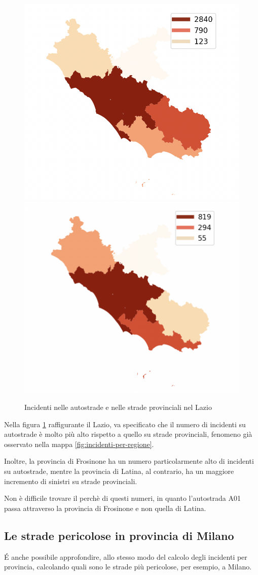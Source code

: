 \documentclass[a4paper]{report}
\begin{document}
\begin{figure}
    \includegraphics[width=0.5\linewidth]{../src/provincia/lazio_autostrade.png}
    \includegraphics[width=0.5\linewidth]{../src/provincia/lazio_strade_prov.png}
    \caption{Incidenti nelle autostrade e nelle strade provinciali nel Lazio}
    \label{fig:lazio-strade}
\end{figure}

Nella figura \ref{fig:lazio-strade} raffigurante il Lazio, va specificato che il numero 
di incidenti su autostrade è molto più alto rispetto a quello su strade provinciali, 
fenomeno già osservato nella mappa \ref{fig:incidenti-per-regione}.

Inoltre, la provincia di Frosinone ha un numero particolarmente alto di incidenti su 
autostrade, mentre la provincia di Latina, al contrario, ha un maggiore incremento di 
sinistri su strade provinciali.

Non è difficile trovare il perchè di questi numeri, in quanto l'autostrada A01 passa 
attraverso la provincia di Frosinone e non quella di Latina.

\subsection{Le strade pericolose in provincia di Milano}

\'E anche possibile approfondire, allo stesso modo del calcolo degli incidenti per 
provincia, calcolando quali sono le strade più pericolose, per esempio, 
a Milano.
\end{document}
